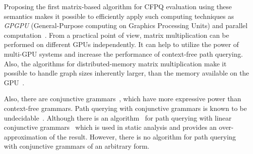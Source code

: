Proposing the first matrix-based algorithm for CFPQ evaluation using these semantics makes it possible to efficiently apply such computing techniques as \emph{GPGPU} (General-Purpose computing on Graphics Processing Units) and parallel computation~\cite{matricesOnGPGPU}. From a practical point of view, matrix multiplication can be performed on different GPUs independently. It can help to utilize the power of multi-GPU systems and increase the performance of context-free path querying. Also, the algorithms for distributed-memory matrix multiplication make it possible to handle graph sizes inherently larger, than the memory available on the GPU~\cite{choi1994pumma, hetero_multi-GPU, MM_on_multi-GPU}.

Also, there are conjunctive grammars~\cite{okhotinConjAndBool}, which have more expressive power than context-free grammars. Path querying with conjunctive grammars is known to be undecidable~\cite{hellingsRelational}. Although there is an algorithm~\cite{zhang2017context} for path querying with linear conjunctive grammars~\cite{okhotinConjAndBool} which is used in static analysis and provides an over-approximation of the result. However, there is no algorithm for path querying with conjunctive grammars of an arbitrary form.




